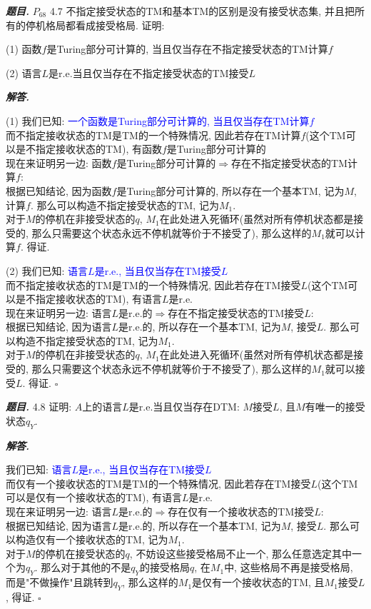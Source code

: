 \documentclass[10pt, a4paper, oneside]{ctexart}
\newenvironment{problem}{\begin{framed}\par\noindent\textbf{\textit{题目. }}}{\end{framed}\par}
\newenvironment{solution}{%
  \par\noindent\textbf{\textit{解答. }}\ignorespaces
}{%
  \hfill\ensuremath{\square}\par
}
\begin{document}
\begin{problem}
$P_{68}$ 4.7 不指定接受状态的TM和基本TM的区别是没有接受状态集, 并且把所有的停机格局都看成接受格局. 证明:

(1) 函数$f$是Turing部分可计算的, 当且仅当存在不指定接受状态的TM计算$f$

(2) 语言$L$是r.e.当且仅当存在不指定接受状态的TM接受$L$
\end{problem}
\begin{solution}
(1) 我们已知: \textcolor{blue}{一个函数是Turing部分可计算的, 当且仅当存在TM计算$f$}\\
而不指定接收状态的TM是TM的一个特殊情况, 因此若存在TM计算$f$(这个TM可以是不指定接收状态的TM), 有函数$f$是Turing部分可计算的\\
现在来证明另一边: 函数$f$是Turing部分可计算的$\Rightarrow$存在不指定接受状态的TM计算$f$:\\
根据已知结论, 因为函数$f$是Turing部分可计算的, 所以存在一个基本TM, 记为$M$, 计算$f$. 那么可以构造不指定接受状态的TM, 记为$M_1$.\\
对于$M$的停机在非接受状态的$q$, $M_1$在此处进入死循环(虽然对所有停机状态都是接受的, 那么只需要这个状态永远不停机就等价于不接受了), 那么这样的$M_1$就可以计算$f$. 得证.

(2) 我们已知: \textcolor{blue}{语言$L$是r.e., 当且仅当存在TM接受$L$}\\
而不指定接收状态的TM是TM的一个特殊情况, 因此若存在TM接受$L$(这个TM可以是不指定接收状态的TM), 有语言$L$是r.e.\\
现在来证明另一边: 语言$L$是r.e.的$\Rightarrow$存在不指定接受状态的TM接受$L$:\\
根据已知结论, 因为语言$L$是r.e.的, 所以存在一个基本TM, 记为$M$, 接受$L$. 那么可以构造不指定接受状态的TM, 记为$M_1$.\\
对于$M$的停机在非接受状态的$q$, $M_1$在此处进入死循环(虽然对所有停机状态都是接受的, 那么只需要这个状态永远不停机就等价于不接受了), 那么这样的$M_1$就可以接受$L$. 得证.
\end{solution}

\begin{problem}
4.8 证明: $A$上的语言$L$是r.e.当且仅当存在DTM: $M$接受$L$, 且$M$有唯一的接受状态$q_{Y}$.
\end{problem}
\begin{solution}
我们已知: \textcolor{blue}{语言$L$是r.e., 当且仅当存在TM接受$L$}\\
而仅有一个接收状态的TM是TM的一个特殊情况, 因此若存在TM接受$L$(这个TM可以是仅有一个接收状态的TM), 有语言$L$是r.e.\\
现在来证明另一边: 语言$L$是r.e.的$\Rightarrow$存在仅有一个接收状态的TM接受$L$:\\
根据已知结论, 因为语言$L$是r.e.的, 所以存在一个基本TM, 记为$M$, 接受$L$. 那么可以构造仅有一个接收状态的TM, 记为$M_1$.\\
对于$M$的停机在接受状态的$q$, 不妨设这些接受格局不止一个, 那么任意选定其中一个为$q_Y$. 那么对于其他的不是$q_Y$的接受格局$q$, 在$M_1$中, 这些格局不再是接受格局, 而是"不做操作"且跳转到$q_Y$, 那么这样的$M_1$是仅有一个接收状态的TM, 且$M_1$接受$L$, 得证.
\end{solution}
\end{document}
